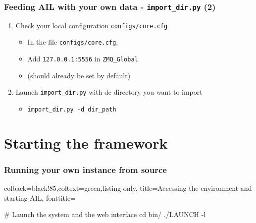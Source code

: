 \documentclass{beamer}
\begin{document}
\begin{frame}
    \frametitle{Feeding AIL with your own data - \texttt{import\_dir.py} (2)}
    \begin{enumerate}
        \item Check your local configuration \texttt{\large{configs/core.cfg}}
            \begin{itemize}
                \item In the file \texttt{\large{configs/core.cfg}},
                \item Add \texttt{127.0.0.1:5556} in \texttt{ZMQ\_Global}
                \item (should already be set by default)
            \end{itemize}
        \item Launch \texttt{import\_dir.py} with de directory you want to import
            \begin{itemize}
                \item \texttt{import\_dir.py -d dir\_path}
            \end{itemize}
    \end{enumerate}
\end{frame}

\section{Starting the framework}
\lstset{style=bash}
\begin{frame}[fragile]
    \frametitle{Running your own instance from source}
    \begin{tcblisting}{colback=black!85,coltext=green,listing only,
        title=Accessing the environment and starting AIL, fonttitle=\bfseries}

# Launch the system and the web interface
cd bin/
./LAUNCH -l

\end{tcblisting}
\end{frame}

\end{document}
